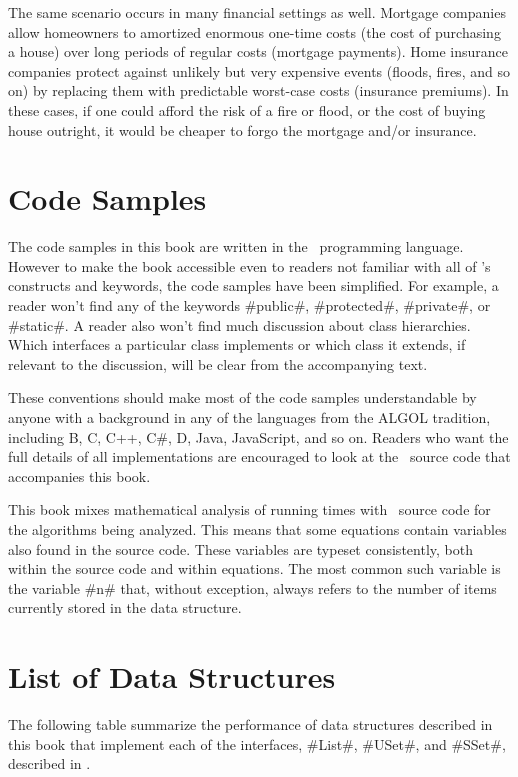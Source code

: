 The same scenario occurs in many financial settings as well.  Mortgage
companies allow homeowners to amortized enormous one-time costs
(the cost of purchasing a house) over long periods of regular costs
(mortgage payments).  Home insurance companies protect against unlikely
but very expensive events (floods, fires, and so on) by replacing them
with predictable worst-case costs (insurance premiums).   In these cases,
if one could afford the risk of a fire or flood, or the cost of buying
house outright, it would be cheaper to forgo the mortgage and/or insurance.


\section{Code Samples}

The code samples in this book are written in the \lang\ programming
language.  However to make the book accessible even to readers not
familiar with all of \lang's constructs and keywords, the code samples
have been simplified.  For example, a reader won't find any of the
keywords #public#, #protected#, #private#, or #static#.  A reader also
won't find much discussion about class hierarchies.  Which interfaces
a particular class implements or which class it extends, if relevant to
the discussion, will be clear from the accompanying text.

These conventions should make most of the code samples understandable by
anyone with a background in any of the languages from the ALGOL tradition,
including B, C, C++, C\#, D, Java, JavaScript, and so on.  Readers who want
the full details of all implementations are encouraged to look at the
\lang\ source code that accompanies this book.

This book mixes mathematical analysis of running times with \lang\
source code for the algorithms being analyzed.  This means that
some equations contain variables also found in the source code.
These variables are typeset consistently, both within the source code
and within equations.  The most common such variable is the variable #n#
that, without exception, always refers to the number of items currently
stored in the data structure.

\section{List of Data Structures}

The following table summarize the performance of data structures
described in this book that implement each of the interfaces, #List#,
#USet#, and #SSet#, described in \secref{interfaces}.

